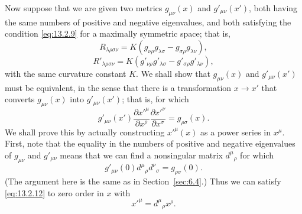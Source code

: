 Now suppose that we are given two metrics \(g_{\mu\nu}(x)\) and
\(g'_{\mu\nu}(x')\), both having the same numbers of positive and negative
eigenvalues, and both satisfying the condition \eqref{eq:13.2.9} for a
maximally symmetric space; that is,
\begin{equation}
  R_{\lambda\rho\sigma\nu}
  =
  K\left(
    g_{\nu\rho}g_{\lambda\sigma}
    -g_{\sigma\rho}g_{\lambda\nu}
  \right),
  \tag{13.2.10}\label{eq:13.2.10}
\end{equation}
\begin{equation}
  R'_{\lambda\rho\sigma\nu}
  =
  K\left(
    g'_{\nu\rho}g'_{\lambda\sigma}
    -g'_{\sigma\rho}g'_{\lambda\nu}
  \right),
  \tag{13.2.11}\label{eq:13.2.11}
\end{equation}
with the same curvature constant \(K\). We shall show that
\(g_{\mu\nu}(x)\) and \(g'_{\mu\nu}(x')\) must be equivalent, in the sense
that there is a transformation \(x\longrightarrow x'\) that converts
\(g_{\mu\nu}(x)\) into \(g'_{\mu\nu}(x')\); that is, for which
\begin{equation}
  g'_{\mu\nu}(x')
  \frac{\partial x'^\mu}{\partial x^\rho}
  \frac{\partial x'^\nu}{\partial x^\sigma}
  =
  g_{\rho\sigma}(x).
  \tag{13.2.12}\label{eq:13.2.12}
\end{equation}
We shall prove this by actually constructing \(x'^\mu(x)\) as a power series
in \(x^\mu\). First, note that the equality in the numbers of positive and
negative eigenvalues of \(g_{\mu\nu}\) and \(g'_{\mu\nu}\) means that we
can find a nonsingular matrix \(d^\mu{}_\rho\) for which
\begin{equation}
  g'_{\mu\nu}(0)d^\mu{}_\rho d^\nu{}_\sigma
  =
  g_{\rho\sigma}(0).
  \tag{13.2.13}\label{eq:13.2.13}
\end{equation}
(The argument here is the same as in Section~\ref{sec:6.4}.) Thus we can
satisfy \eqref{eq:13.2.12} to zero order in \(x\) with
\[
  x'^\mu=d^\mu{}_\rho x^\rho.
\]

